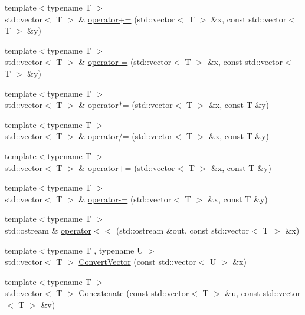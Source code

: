 \begin{DoxyCompactItemize}
\item 
{\footnotesize template$<$typename T $>$ }\\std\+::vector$<$ T $>$ \& \hyperlink{contrafold_2_utilities_8ipp_a8a1d708250dbef941e052cfbab978587}{operator+=} (std\+::vector$<$ T $>$ \&x, const std\+::vector$<$ T $>$ \&y)
\item 
{\footnotesize template$<$typename T $>$ }\\std\+::vector$<$ T $>$ \& \hyperlink{contrafold_2_utilities_8ipp_a83468849cdd5d53237c8e59d477d66d9}{operator-\/=} (std\+::vector$<$ T $>$ \&x, const std\+::vector$<$ T $>$ \&y)
\item 
{\footnotesize template$<$typename T $>$ }\\std\+::vector$<$ T $>$ \& \hyperlink{contrafold_2_utilities_8ipp_a8a39142b83e4405e96095bb4ea56f5e4}{operator$\ast$=} (std\+::vector$<$ T $>$ \&x, const T \&y)
\item 
{\footnotesize template$<$typename T $>$ }\\std\+::vector$<$ T $>$ \& \hyperlink{contrafold_2_utilities_8ipp_a93647e730c315e23104a566b3378b579}{operator/=} (std\+::vector$<$ T $>$ \&x, const T \&y)
\item 
{\footnotesize template$<$typename T $>$ }\\std\+::vector$<$ T $>$ \& \hyperlink{contrafold_2_utilities_8ipp_a3d01d5a3402946045dd14ec2747d804a}{operator+=} (std\+::vector$<$ T $>$ \&x, const T \&y)
\item 
{\footnotesize template$<$typename T $>$ }\\std\+::vector$<$ T $>$ \& \hyperlink{contrafold_2_utilities_8ipp_aaa19f8f84602aebf0399a95eacc57f75}{operator-\/=} (std\+::vector$<$ T $>$ \&x, const T \&y)
\item 
{\footnotesize template$<$typename T $>$ }\\std\+::ostream \& \hyperlink{contrafold_2_utilities_8ipp_af49746185f37a374b3443aac9437a813}{operator$<$$<$} (std\+::ostream \&out, const std\+::vector$<$ T $>$ \&x)
\item 
{\footnotesize template$<$typename T , typename U $>$ }\\std\+::vector$<$ T $>$ \hyperlink{contrafold_2_utilities_8ipp_a203b94ca459c645a42ff19c0e32f9d8f}{Convert\+Vector} (const std\+::vector$<$ U $>$ \&x)
\item 
{\footnotesize template$<$typename T $>$ }\\std\+::vector$<$ T $>$ \hyperlink{contrafold_2_utilities_8ipp_a699f9c877b339b8c0b945fdef29e33af}{Concatenate} (const std\+::vector$<$ T $>$ \&u, const std\+::vector$<$ T $>$ \&v)

\end{DoxyCompactItemize}
